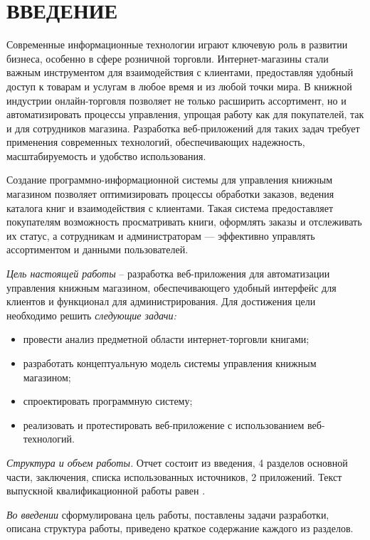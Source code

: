 \section*{ВВЕДЕНИЕ}

Современные информационные технологии играют ключевую роль в развитии бизнеса, особенно в сфере розничной торговли. Интернет-магазины стали важным инструментом для взаимодействия с клиентами, предоставляя удобный доступ к товарам и услугам в любое время и из любой точки мира. В книжной индустрии онлайн-торговля позволяет не только расширить ассортимент, но и автоматизировать процессы управления, упрощая работу как для покупателей, так и для сотрудников магазина. Разработка веб-приложений для таких задач требует применения современных технологий, обеспечивающих надежность, масштабируемость и удобство использования.

Создание программно-информационной системы для управления книжным магазином позволяет оптимизировать процессы обработки заказов, ведения каталога книг и взаимодействия с клиентами. Такая система предоставляет покупателям возможность просматривать книги, оформлять заказы и отслеживать их статус, а сотрудникам и администраторам — эффективно управлять ассортиментом и данными пользователей.

\emph{Цель настоящей работы} – разработка веб-приложения для автоматизации управления книжным магазином, обеспечивающего удобный интерфейс для клиентов и функционал для администрирования. Для достижения цели необходимо решить \emph{следующие задачи:}
\begin{itemize}
\item провести анализ предметной области интернет-торговли книгами;
\item разработать концептуальную модель системы управления книжным магазином;
\item спроектировать программную систему;
\item реализовать и протестировать веб-приложение с использованием веб-технологий.
\end{itemize}

\emph{Структура и объем работы.} Отчет состоит из введения, 4 разделов основной части, заключения, списка использованных источников, 2 приложений. Текст выпускной квалификационной работы равен .

\emph{Во введении} сформулирована цель работы, поставлены задачи разработки, описана структура работы, приведено краткое содержание каждого из разделов.

